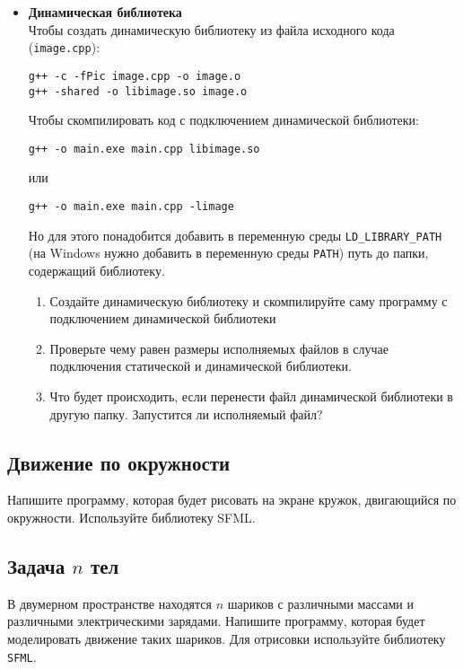 \documentclass{article}
\begin{document}
\begin{itemize}
\item \textbf{Динамическая библиотека} \\
Чтобы создать динамическую библиотеку из файла исходного кода (\texttt{image.cpp}):
\begin{verbatim}
g++ -c -fPic image.cpp -o image.o
g++ -shared -o libimage.so image.o
\end{verbatim}
Чтобы скомпилировать код с подключением динамической библиотеки:
\begin{verbatim}
g++ -o main.exe main.cpp libimage.so
\end{verbatim}
или
\begin{verbatim}
g++ -o main.exe main.cpp -limage
\end{verbatim}
Но для этого понадобится добавить в переменную среды \texttt{LD\_LIBRARY\_PATH} (на Windows нужно добавить в переменную среды \texttt{PATH}) путь до папки, содержащий библиотеку.
\begin{enumerate}
\item Создайте динамическую библиотеку и скомпилируйте саму программу с подключением динамической библиотеки
\item Проверьте чему равен размеры исполняемых файлов в случае подключения статической и динамической библиотеки.
\item Что будет происходить, если перенести файл динамической библиотеки в другую папку. Запустится ли исполняемый файл?
\end{enumerate}
\end{itemize}



\subsection{Движение по окружности}
Напишите программу, которая будет рисовать на экране кружок, двигающийся по окружности. Используйте библиотеку SFML.


\subsection{Задача $n$ тел}
В двумерном пространстве находятся $n$ шариков с различными массами и различными электрическими зарядами. Напишите программу, которая будет моделировать движение таких шариков. Для отрисовки используйте библиотеку \texttt{SFML}.\\
\end{document}
